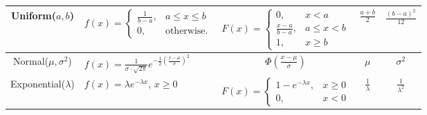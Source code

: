 \documentclass[11pt,a4paper,english]{article} %
\begin{document}
\begin{table}[h!]
\begin{tabular}{cp{5cm}ccc}
Uniform($a, b$) & $f(x) = \begin{cases} \frac{1}{b-a}, & a \leq x \leq b \\ 0, & \text{otherwise.} \end{cases}$ & $F(x) = \begin{cases} 
0, & x < a \\
\frac{x-a}{b-a}, & a \leq x < b \\ 1, & x \geq b \end{cases}$ & $\frac{a+b}{2}$ & $\frac{(b-a)^2}{12}$ \\ \midrule
Normal($\mu, \sigma^2$) & $f(x) = \frac{1}{\sigma\cdot\sqrt{2\pi}} e^{-\frac{1}{2}\left(\frac{x-\mu}{\sigma}\right)^2}$ & $\Phi\left(\frac{x-\mu}{\sigma}\right)$ & $\mu$ & $\sigma^2$ \\ \midrule
Exponential($\lambda$) & $f(x) = \lambda e^{-\lambda x}$, $x \geq 0$ & $F(x) = \begin{cases} 1 - e^{-\lambda x}, & x \geq 0 \\ 0, & x < 0 \end{cases}$ & $\frac{1}{\lambda}$ & $\frac{1}{\lambda^2}$ \\ 
\bottomrule
\end{tabular}
\end{table}

\newpage
\end{document}

